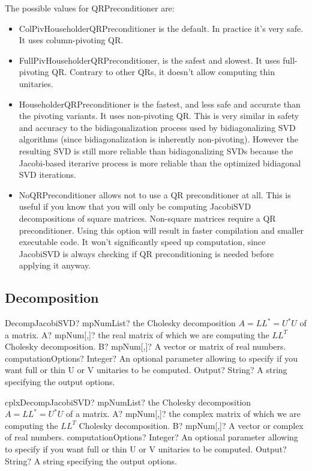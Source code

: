 The possible values for QRPreconditioner are: 
\begin{itemize}
	\item ColPivHouseholderQRPreconditioner is the default. In practice it's very safe. It uses column-pivoting QR. 
	\item FullPivHouseholderQRPreconditioner, is the safest and slowest. It uses full-pivoting QR. Contrary to other QRs, it doesn't allow computing thin unitaries. 
	\item HouseholderQRPreconditioner is the fastest, and less safe and accurate than the pivoting variants. It uses non-pivoting QR. This is very similar in safety and accuracy to the bidiagonalization process used by bidiagonalizing SVD algorithms (since bidiagonalization is inherently non-pivoting). However the resulting SVD is still more reliable than bidiagonalizing SVDs because the Jacobi-based iterarive process is more reliable than the optimized bidiagonal SVD iterations. 
	\item NoQRPreconditioner allows not to use a QR preconditioner at all. This is useful if you know that you will only be computing JacobiSVD decompositions of square matrices. Non-square matrices require a QR preconditioner. Using this option will result in faster compilation and smaller executable code. It won't significantly speed up computation, since JacobiSVD is always checking if QR preconditioning is needed before applying it anyway.
\end{itemize}




\subsection{Decomposition}

\begin{mpFunctionsExtract}
	\mpFunctionFour
	{DecompJacobiSVD? mpNumList? the Cholesky decomposition $A = LL^* = U^*U$ of a matrix.}
	{A? mpNum[,]? the real matrix of which we are computing the $LL^T$ Cholesky decomposition.}
	{B? mpNum[,]? A vector or matrix of real numbers.}
	{computationOptions? Integer? An optional parameter allowing to specify if you want full or thin U or V unitaries to be computed.}
	{Output? String? A string specifying the output options.}
\end{mpFunctionsExtract}

\vspace{0.6cm}
\begin{mpFunctionsExtract}
	\mpFunctionFour
	{cplxDecompJacobiSVD? mpNumList? the Cholesky decomposition $A = LL^* = U^*U$ of a matrix.}
	{A? mpNum[,]? the complex matrix of which we are computing the $LL^T$ Cholesky decomposition.}
	{B? mpNum[,]? A vector or complex of real numbers.}
	{computationOptions? Integer? An optional parameter allowing to specify if you want full or thin U or V unitaries to be computed.}
	{Output? String? A string specifying the output options.}
\end{mpFunctionsExtract}


